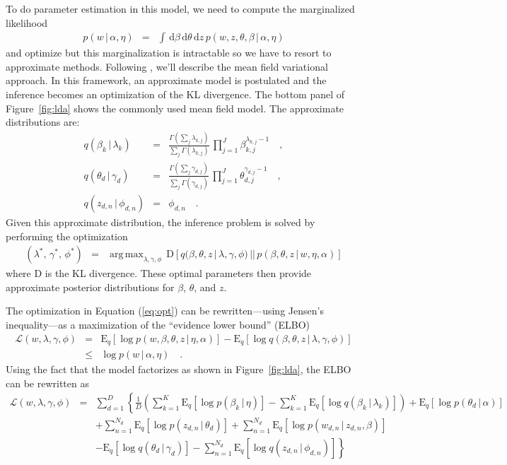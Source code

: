 \documentclass[11pt]{article}
\newcommand{\eq}[1]{Equation (\ref{eq:#1})}
\newcommand{\eqlabel}[1]{\label{eq:#1}}
\newcommand{\fig}[1]{Figure~\ref{fig:#1}}
\newcommand{\dd}{\ensuremath{\, \mathrm{d}}}
\newcommand{\expect}[2]{\ensuremath{\mathrm{E}_{#1}\left [ {#2} \right ]}}
\DeclareMathOperator*{\argmax}{arg\,max}
\begin{document}
To do parameter estimation in this model, we need to compute the marginalized
likelihood
\begin{eqnarray}
p(w\,|\,\alpha,\eta) &=& \int\dd\beta\dd\theta\dd z \,
    p(w,z,\theta,\beta\,|\,\alpha,\eta)
\end{eqnarray}
and optimize but this marginalization is intractable so we have to resort to
approximate methods.
Following \citet{lda}, we'll describe the mean field variational approach.
In this framework, an approximate model is postulated and the inference
becomes an optimization of the KL divergence.
The bottom panel of \fig{lda} shows the commonly used mean field model.
The approximate distributions are:
\begin{eqnarray}
q(\beta_k\,|\,\lambda_k) &=&
\frac{\Gamma\left( \sum_j \lambda_{k,j} \right)}{\sum_j \Gamma(\lambda_{k,j})}
\, \prod_{j=1}^J \beta_{k,j}^{\lambda_{k,j}-1} \quad, \\
q(\theta_d\,|\,\gamma_d) &=&
\frac{\Gamma\left( \sum_j \gamma_{d,j} \right)}{\sum_j \Gamma(\gamma_{d,j})}
\, \prod_{j=1}^J \theta_{d,j}^{\gamma_{d,j}-1} \quad, \\
q(z_{d,n}\,|\,\phi_{d,n}) &=& \phi_{d,n} \quad.
\end{eqnarray}
Given this approximate distribution, the inference problem is solved by
performing the optimization
\begin{eqnarray}\eqlabel{opt}
(\lambda^*,\,\gamma^*,\,\phi^*) &=& \argmax_{\lambda,\gamma,\phi}
\,\mathrm{D}\left [ q(\beta,\theta,z\,|\,\lambda,\gamma,\phi)\,||\,
p(\beta,\theta,z\,|\,w,\eta,\alpha)\right ]
\end{eqnarray}
where D is the KL divergence.
These optimal parameters then provide approximate posterior distributions for
$\beta$, $\theta$, and $z$.

The optimization in \eq{opt} can be rewritten---using Jensen's inequality---as
a maximization of the ``evidence lower bound'' (ELBO)
\begin{eqnarray}
\mathcal{L}(w,\lambda,\gamma,\phi) &=&
\expect{q}{\log p(w,\beta,\theta,z\,|\,\eta,\alpha)}
- \expect{q}{\log q(\beta,\theta,z\,|\,\lambda,\gamma,\phi)} \\
&\le& \log p(w\,|\,\alpha,\eta) \quad.
\end{eqnarray}
Using the fact that the model factorizes as shown in \fig{lda}, the ELBO can
be rewritten as
\begin{eqnarray}
\mathcal{L}(w,\lambda,\gamma,\phi) &=&
    \sum_{d=1}^D\left \{ \frac{1}{D} \left (
    \sum_{k=1}^K \expect{q}{\log p(\beta_k\,|\,\eta)}
    -\sum_{k=1}^K \expect{q}{\log q(\beta_k\,|\,\lambda_k)} \right )
    + \expect{q}{\log p(\theta_d\,|\,\alpha)}\right. \nonumber\\
&&  + \sum_{n=1}^{N_d} \expect{q}{\log p(z_{d,n}\,|\,\theta_d)}
    +\sum_{n=1}^{N_d}\expect{q}{\log p(w_{d,n}\,|\,z_{d,n},\beta)}
\nonumber\\
&&  \left.-\expect{q}{\log q(\theta_d\,|\,\gamma_d)}
    -\sum_{n=1}^{N_d} \expect{q}{\log q(z_{d,n}\,|\,\phi_{d,n})}
\right \}
\end{eqnarray}
\end{document}
